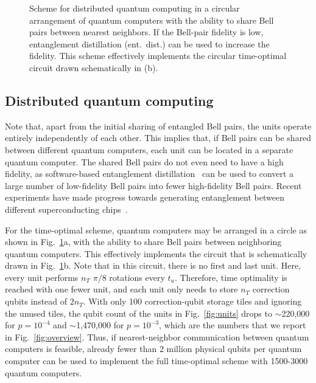 \documentclass[prx,aps,letterpaper,twocolumn,allowfontchageintitle=true,accepted=2019-02-01]{quantumarticle}
\begin{document}
\begin{figure}[t!]
\centering
\def\svgwidth{0.99\linewidth}

\caption{Scheme for distributed quantum computing in a circular arrangement of quantum computers with the ability to share Bell pairs between nearest neighbors. If the Bell-pair fidelity is low, entanglement distillation (ent.~dist.) can be used to increase the fidelity. This scheme effectively implements the circular time-optimal circuit drawn schematically in (b).}
\label{fig:distributed}
\end{figure}


\subsection{Distributed quantum computing}

Note that, apart from the initial sharing of entangled Bell pairs, the units operate entirely independently of each other. This implies that, if Bell pairs can be shared between different quantum computers, each unit can be located in a separate quantum computer. The shared Bell pairs do not even need to have a high fidelity, as software-based entanglement distillation~\cite{Bennett1996,Bennett1996a} can be used to convert a large number of low-fidelity Bell pairs into fewer high-fidelity Bell pairs. Recent experiments have made progress towards generating entanglement between different superconducting chips~\cite{Dickel2018,Campagne2018,Axline2018}.



For the time-optimal scheme, quantum computers may be arranged in a circle as shown in Fig.~\ref{fig:distributed}a, with the ability to share Bell pairs between neighboring quantum computers. This effectively implements the circuit that is schematically drawn in Fig.~\ref{fig:distributed}b. Note that in this circuit, there is no first and last unit. Here, every unit performs $n_T$ $\pi/8$ rotations every $t_u$. Therefore, time optimality is reached with one fewer unit, and each unit only needs to store $n_T$ correction qubits instead of $2n_T$. With only 100 correction-qubit storage tiles and ignoring the unused tiles, the qubit count of the units in Fig.~\ref{fig:units} drops to ${\sim}$220,000 for $p=10^{-4}$ and ${\sim}$1,470,000 for $p=10^{-3}$, which are the numbers that we report in Fig.~\ref{fig:overview}. Thus, if nearest-neighbor communication between quantum computers is feasible, already fewer than 2 million physical qubits per quantum computer can be used to implement the full time-optimal scheme with 1500-3000 quantum computers.
\end{document}
